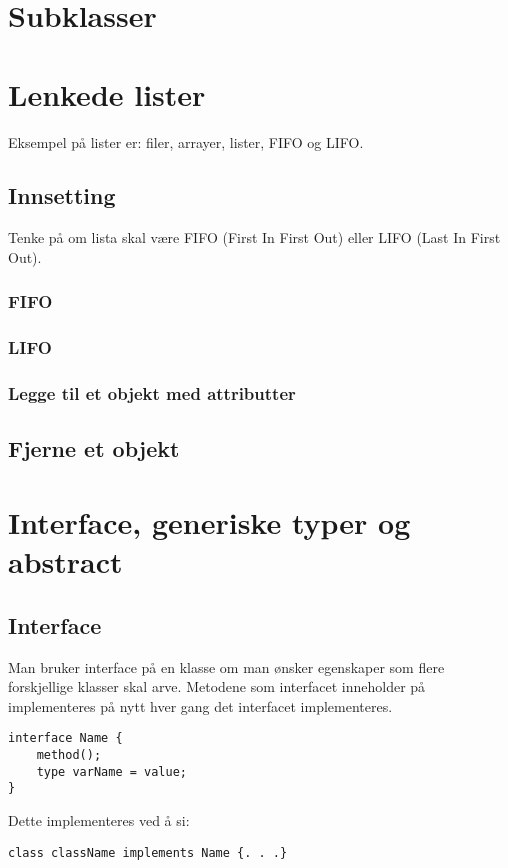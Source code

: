 \documentclass[10pt,a4paper]{article}
\begin{document}
\section{Subklasser}


\section{Lenkede lister}
Eksempel på lister er: filer, arrayer, lister, FIFO og LIFO.

\subsection{Innsetting}
Tenke på om lista skal være FIFO (First In First Out) eller LIFO (Last In First Out).
\subsubsection{FIFO}

\subsubsection{LIFO}

\subsubsection{Legge til et objekt med attributter}


\subsection{Fjerne et objekt}


\section{Interface, generiske typer og abstract}
\subsection{Interface}
Man bruker interface på en klasse om man ønsker egenskaper som flere forskjellige klasser skal arve. Metodene som interfacet inneholder på implementeres på nytt hver gang det interfacet implementeres.


\begin{lstlisting}
interface Name {
	method();
	type varName = value;
}
\end{lstlisting}
Dette implementeres ved å si:
\begin{lstlisting}
class className implements Name {. . .}
\end{lstlisting}
\end{document}
